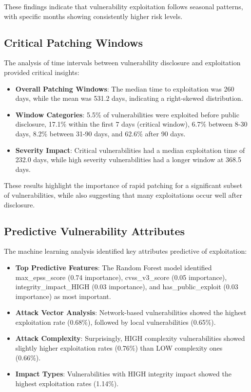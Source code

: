 \documentclass[runningheads]{llncs}
\begin{document}
These findings indicate that vulnerability exploitation follows seasonal patterns, with specific months showing consistently higher risk levels.

\subsection{Critical Patching Windows}
The analysis of time intervals between vulnerability disclosure and exploitation provided critical insights:

\begin{itemize}
    \item \textbf{Overall Patching Windows}: The median time to exploitation was 260 days, while the mean was 531.2 days, indicating a right-skewed distribution.
    
    \item \textbf{Window Categories}: 5.5\% of vulnerabilities were exploited before public disclosure, 17.1\% within the first 7 days (critical window), 6.7\% between 8-30 days, 8.2\% between 31-90 days, and 62.6\% after 90 days.
    
    \item \textbf{Severity Impact}: Critical vulnerabilities had a median exploitation time of 232.0 days, while high severity vulnerabilities had a longer window at 368.5 days.
\end{itemize}

These results highlight the importance of rapid patching for a significant subset of vulnerabilities, while also suggesting that many exploitations occur well after disclosure.

\subsection{Predictive Vulnerability Attributes}
The machine learning analysis identified key attributes predictive of exploitation:

\begin{itemize}
    \item \textbf{Top Predictive Features}: The Random Forest model identified max\_epss\_score (0.74 importance), cvss\_v3\_score (0.05 importance), integrity\_impact\_HIGH (0.03 importance), and has\_public\_exploit (0.03 importance) as most important.
    
    \item \textbf{Attack Vector Analysis}: Network-based vulnerabilities showed the highest exploitation rate (0.68\%), followed by local vulnerabilities (0.65\%).
    
    \item \textbf{Attack Complexity}: Surprisingly, HIGH complexity vulnerabilities showed slightly higher exploitation rates (0.76\%) than LOW complexity ones (0.66\%).
    
    \item \textbf{Impact Types}: Vulnerabilities with HIGH integrity impact showed the highest exploitation rates (1.14\%).
\end{itemize}
\end{document}
